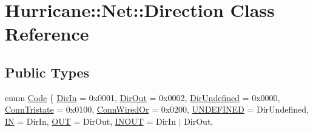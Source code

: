 \hypertarget{classHurricane_1_1Net_1_1Direction}{}\section{Hurricane\+:\+:Net\+:\+:Direction Class Reference}
\label{classHurricane_1_1Net_1_1Direction}
\subsection*{Public Types}
\begin{DoxyCompactItemize}
\item 
enum \mbox{\hyperlink{classHurricane_1_1Net_1_1Direction_a5b34d7c3ac52628861af3a46f781fae4}{Code}} \{ \newline
\mbox{\hyperlink{classHurricane_1_1Net_1_1Direction_a5b34d7c3ac52628861af3a46f781fae4a36971421023586a2b5b019f468d699ba}{Dir\+In}} = 0x0001, 
\newline
\mbox{\hyperlink{classHurricane_1_1Net_1_1Direction_a5b34d7c3ac52628861af3a46f781fae4a1135f8c6a05d3801c43684bc195f66f0}{Dir\+Out}} = 0x0002, 
\newline
\mbox{\hyperlink{classHurricane_1_1Net_1_1Direction_a5b34d7c3ac52628861af3a46f781fae4a368b35a5f289879ad5c6862dfebc1b96}{Dir\+Undefined}} = 0x0000, 
\newline
\mbox{\hyperlink{classHurricane_1_1Net_1_1Direction_a5b34d7c3ac52628861af3a46f781fae4afa0b4523129378e11f6e9bdc72fba627}{Conn\+Tristate}} = 0x0100, 
\newline
\mbox{\hyperlink{classHurricane_1_1Net_1_1Direction_a5b34d7c3ac52628861af3a46f781fae4a03861307a54d5204f34c74365aa58f04}{Conn\+Wired\+Or}} = 0x0200, 
\newline
\mbox{\hyperlink{classHurricane_1_1Net_1_1Direction_a5b34d7c3ac52628861af3a46f781fae4ad15ab42a0127de740e1c2c05841c153a}{U\+N\+D\+E\+F\+I\+N\+ED}} = Dir\+Undefined, 
\newline
\mbox{\hyperlink{classHurricane_1_1Net_1_1Direction_a5b34d7c3ac52628861af3a46f781fae4aae6e926e7787f90824a4ee961e6ddac1}{IN}} = Dir\+In, 
\newline
\mbox{\hyperlink{classHurricane_1_1Net_1_1Direction_a5b34d7c3ac52628861af3a46f781fae4a2dac58452d767718df817bcf65906969}{O\+UT}} = Dir\+Out, 
\newline
\mbox{\hyperlink{classHurricane_1_1Net_1_1Direction_a5b34d7c3ac52628861af3a46f781fae4aa88aea57d992b95a08c24716b5265afd}{I\+N\+O\+UT}} = Dir\+In $\vert$ Dir\+Out, 
\newline

\end{DoxyCompactItemize}
